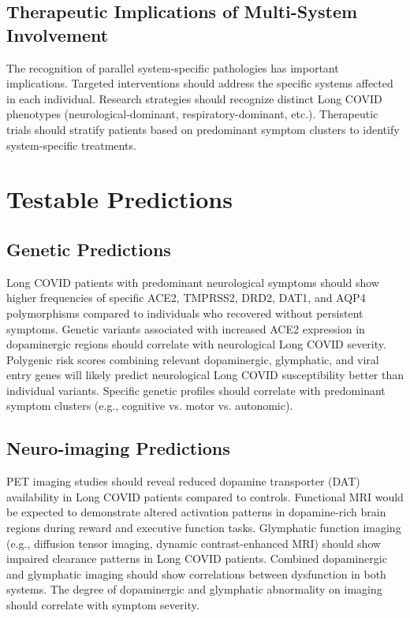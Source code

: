 \documentclass[12pt]{article}
\begin{document}
\subsection{Therapeutic Implications of Multi-System Involvement}

The recognition of parallel system-specific pathologies has important implications. Targeted interventions should address the specific systems affected in each individual. Research strategies should recognize distinct Long COVID phenotypes (neurological-dominant, respiratory-dominant, etc.). Therapeutic trials should stratify patients based on predominant symptom clusters to identify system-specific treatments.

\section{Testable Predictions}

\subsection{Genetic Predictions}

Long COVID patients with predominant neurological symptoms should show higher frequencies of specific ACE2, TMPRSS2, DRD2, DAT1, and AQP4 polymorphisms compared to individuals who recovered without persistent symptoms. Genetic variants associated with increased ACE2 expression in dopaminergic regions should correlate with neurological Long COVID severity. Polygenic risk scores combining relevant dopaminergic, glymphatic, and viral entry genes will likely predict neurological Long COVID susceptibility better than individual variants. Specific genetic profiles should correlate with predominant symptom clusters (e.g., cognitive vs. motor vs. autonomic).

\subsection{Neuro-imaging Predictions}

PET imaging studies should reveal reduced dopamine transporter (DAT) availability in Long COVID patients compared to controls. Functional MRI would be expected to demonstrate altered activation patterns in dopamine-rich brain regions during reward and executive function tasks. Glymphatic function imaging (e.g., diffusion tensor imaging, dynamic contrast-enhanced MRI) should show impaired clearance patterns in Long COVID patients. Combined dopaminergic and glymphatic imaging should show correlations between dysfunction in both systems. The degree of dopaminergic and glymphatic abnormality on imaging should correlate with symptom severity.
\end{document}
